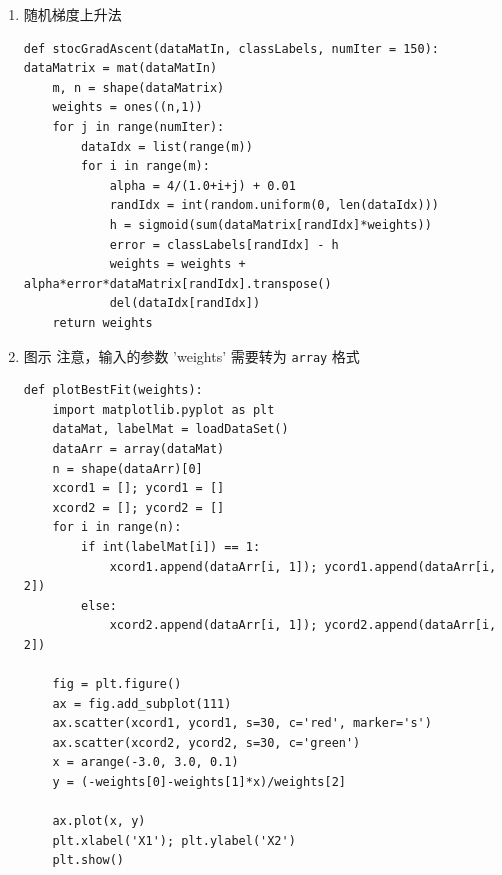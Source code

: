 \documentclass[11pt]{ctexart}
\begin{document}
\begin{enumerate}
\begin{enumerate}
\begin{lstlisting}
    # m: 数据点数目; n: 坐标数, 表示空间维数
    m, n = shape(dataMatrix)
    # 设置步长
    alpha = 0.001
    # 设置最大步数
    maxCycles = 500
    # 设置回归系数，应该是 3 个回归系数
    # 考虑到数据点的三个坐标乘以回归系数
    # 三个坐标处于矩阵列的位置，相应的，回归系数处于行的位置
    weights = ones((n, 1))
    # 在最大步数下，做梯度上升运算，求极大值
    for k in range(maxCycles):
        # sigmoid(Z) = sigmoid(w*x)
        h = sigmoid(dataMatrix*weights)
        # 在计算 log 型似然函数求偏导时
        # 其中任意项对j分量偏导化简结果是(y-sigmoid(Z))x_j
        error = labelMat - h
        # 阶梯上升下一移动方向与步长
        # 需要注意的是，对整体的对数似然函数梯度而言
        # 相当于各数据点的单项似然函数梯度之和
        # w' = w + \alphax\sum(\nabla(sigmoid(Z(i))))
        # 需要注意矩阵乘法， error 是 100x3 矩阵
        weights = weights + alpha*dataMatrix.transpose()*error
    return weights
\end{lstlisting}

\item 随机梯度上升法
\lstset{language=Python,label= ,caption= ,captionpos=b,numbers=none}
\begin{lstlisting}
def stocGradAscent(dataMatIn, classLabels, numIter = 150):
dataMatrix = mat(dataMatIn)
    m, n = shape(dataMatrix)
    weights = ones((n,1))
    for j in range(numIter):
        dataIdx = list(range(m))
        for i in range(m):
            alpha = 4/(1.0+i+j) + 0.01
            randIdx = int(random.uniform(0, len(dataIdx)))
            h = sigmoid(sum(dataMatrix[randIdx]*weights))
            error = classLabels[randIdx] - h
            weights = weights + alpha*error*dataMatrix[randIdx].transpose()
            del(dataIdx[randIdx])
    return weights
\end{lstlisting}

\item 图示
注意，输入的参数 'weights' 需要转为 \texttt{array} 格式
\lstset{language=Python,label= ,caption= ,captionpos=b,numbers=none}
\begin{lstlisting}
def plotBestFit(weights):
    import matplotlib.pyplot as plt
    dataMat, labelMat = loadDataSet()
    dataArr = array(dataMat)
    n = shape(dataArr)[0]
    xcord1 = []; ycord1 = []
    xcord2 = []; ycord2 = []
    for i in range(n):
        if int(labelMat[i]) == 1:
            xcord1.append(dataArr[i, 1]); ycord1.append(dataArr[i, 2])
        else:
            xcord2.append(dataArr[i, 1]); ycord2.append(dataArr[i, 2])

    fig = plt.figure()
    ax = fig.add_subplot(111)
    ax.scatter(xcord1, ycord1, s=30, c='red', marker='s')
    ax.scatter(xcord2, ycord2, s=30, c='green')
    x = arange(-3.0, 3.0, 0.1)
    y = (-weights[0]-weights[1]*x)/weights[2]

    ax.plot(x, y)
    plt.xlabel('X1'); plt.ylabel('X2')
    plt.show()
\end{lstlisting}
\end{enumerate}
\end{enumerate}
\end{document}
